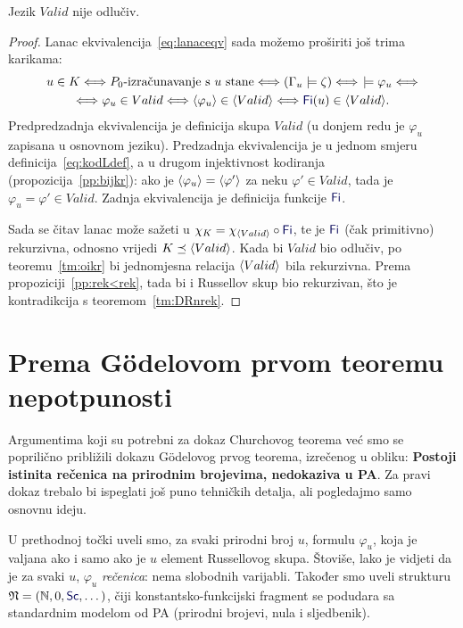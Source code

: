 \begin{propozicija}
Jezik $Valid$ nije odlučiv.
\end{propozicija}
\begin{proof}
Lanac ekvivalencija~\eqref{eq:lanaceqv} sada možemo proširiti još trima karikama:
\begin{multline}
    u\in K
    \Longleftrightarrow
    \text{$P_0$-izračunavanje s $u$ stane}
    \Longleftrightarrow
    (\Gamma_u\models\zeta)
    \Longleftrightarrow{}\!
    \models\varphi_u
    \Longleftrightarrow\\
    \Longleftrightarrow
    \varphi_u\in Valid
    \Longleftrightarrow
    \kr{\varphi_u}\in\kr{Valid}
    \Longleftrightarrow
    \f{Fi}(u)\in\kr{Valid}
    \text.
\end{multline}
Predpredzadnja ekvivalencija je definicija skupa $Valid$ (u donjem redu je $\varphi_u$ zapisana u osnovnom jeziku). Predzadnja ekvivalencija je u jednom smjeru definicija~\eqref{eq:kodLdef}, a u drugom injektivnost kodiranja (propozicija~\ref{pp:bijkr}): ako je $\langle\varphi_u\rangle=\langle\varphi'\rangle$ za neku $\varphi'\in Valid$, tada je $\varphi_u=\varphi'\in Valid$. Zadnja ekvivalencija je definicija funkcije $\f{Fi}$.

Sada se čitav lanac može sažeti u $\chi_{K}=\chi_{\kr{Valid}}\circ\f{Fi}$, te je $\f{Fi}$ (čak primitivno) rekurzivna, odnosno vrijedi $K\preceq\langle Valid\rangle$. 
Kada bi $Valid$ bio odlučiv, po teoremu~\ref{tm:oikr} bi jednomjesna relacija $\langle Valid\rangle$ bila rekurzivna. Prema propoziciji~\ref{pp:rek<rek}, tada bi i Russellov skup bio rekurzivan, što je kontradikcija s teoremom~\ref{tm:DRnrek}.
\end{proof}

\section{Prema G\"odelovom prvom teoremu nepotpunosti}

Argumentima koji su potrebni za dokaz Churchovog teorema već smo se poprilično približili dokazu G\"odelovog prvog teorema, izrečenog u obliku: \textbf{Postoji istinita rečenica na prirodnim brojevima, nedokaziva u PA}. Za pravi dokaz trebalo bi ispeglati još puno tehničkih detalja, ali pogledajmo samo osnovnu ideju.

U prethodnoj točki uveli smo, za svaki prirodni broj $u$, formulu $\varphi_u$, koja je valjana ako i samo ako je $u$ element Russellovog skupa. Štoviše, lako je vidjeti da je za svaki $u$, $\varphi_u$ \emph{rečenica}: nema slobodnih varijabli. Također smo uveli strukturu $\mathfrak N=(\N,0,\f{Sc},\dotsc)$, čiji konstantsko-funkcijski fragment se podudara sa standardnim modelom od PA (prirodni brojevi, nula i sljedbenik).

